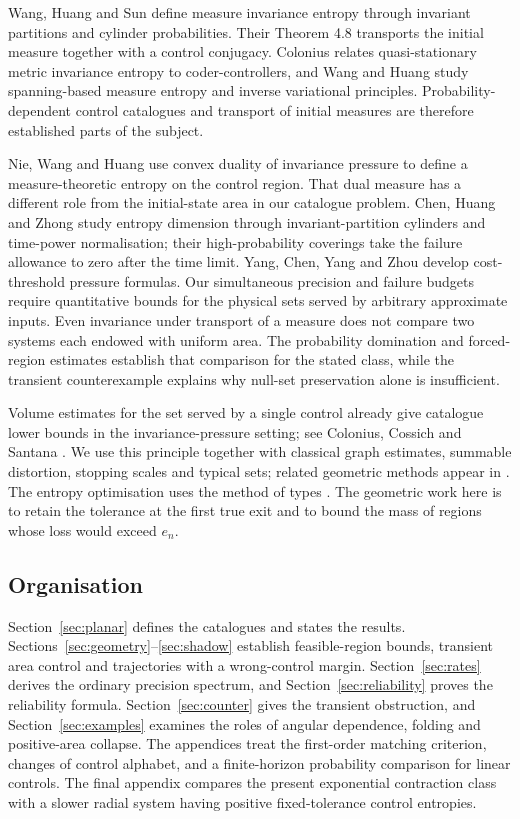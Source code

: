 \documentclass[11pt]{amsart}
\theoremstyle{definition}
\theoremstyle{remark}
\numberwithin{equation}{section}
\begin{document}
Wang, Huang and Sun \cite{WHS2019} define measure invariance
entropy through invariant partitions and cylinder probabilities.
Their Theorem 4.8 transports the initial measure together with a
control conjugacy. Colonius \cite{Colonius2018} relates
quasi-stationary metric invariance entropy to coder-controllers,
and Wang and Huang \cite{WH2022} study spanning-based measure
entropy and inverse variational principles. Probability-dependent
control catalogues and transport of initial measures are therefore
established parts of the subject.

Nie, Wang and Huang \cite{NWH2022} use convex duality of invariance
pressure to define a measure-theoretic entropy on the control region.
That dual measure has a different role from the initial-state area
in our catalogue problem. Chen, Huang and Zhong \cite{CHZ2026}
study entropy dimension through invariant-partition cylinders and
time-power normalisation; their high-probability coverings take the
failure allowance to zero after the time limit. Yang, Chen, Yang
and Zhou \cite{YCYZ2025} develop cost-threshold pressure formulas.
Our simultaneous precision and failure budgets require quantitative
bounds for the physical sets served by arbitrary approximate inputs.
Even invariance under transport of a measure does not compare two
systems each endowed with uniform area. The probability domination
and forced-region estimates establish that comparison for the stated
class, while the transient counterexample explains why null-set
preservation alone is insufficient.

Volume estimates for the set served by a single control already give
catalogue lower bounds in the invariance-pressure setting; see
Colonius, Cossich and Santana \cite{CCS2020}. We use this principle
together with classical graph estimates, summable distortion,
stopping scales and typical sets; related geometric methods appear
in \cite{Hutchinson1981,KD2018}. The entropy optimisation uses
the method of types \cite{Csiszar1998}. The geometric work here
is to retain the tolerance at the first true exit and to bound
the mass of regions whose loss would exceed $e_n$.

\subsection{Organisation}
Section~\ref{sec:planar} defines the catalogues and states the
results. Sections~\ref{sec:geometry}--\ref{sec:shadow} establish
feasible-region bounds, transient area control and trajectories
with a wrong-control margin. Section~\ref{sec:rates} derives the
ordinary precision spectrum, and Section~\ref{sec:reliability}
proves the reliability formula. Section~\ref{sec:counter} gives
the transient obstruction, and Section~\ref{sec:examples} examines
the roles of angular dependence, folding and positive-area collapse.
The appendices treat the first-order matching criterion, changes
of control alphabet, and a finite-horizon probability comparison
for linear controls. The final appendix compares the present
exponential contraction class with a slower radial system having
positive fixed-tolerance control entropies.
\end{document}

